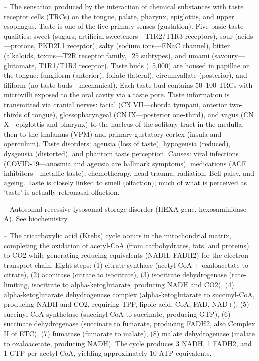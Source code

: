 -- The sensation produced by the interaction of chemical substances with taste receptor cells (TRCs) on the tongue, palate, pharynx, epiglottis, and upper esophagus. Taste is one of the five primary senses (gustation). Five basic taste qualities: sweet (sugars, artificial sweeteners—T1R2/T1R3 receptors), sour (acids—protons, PKD2L1 receptor), salty (sodium ions—ENaC channel), bitter (alkaloids, toxins—T2R receptor family, ~25 subtypes), and umami (savoury—glutamate, T1R1/T1R3 receptor). Taste buds (~5,000) are housed in papillae on the tongue: fungiform (anterior), foliate (lateral), circumvallate (posterior), and filiform (no taste buds—mechanical). Each taste bud contains 50--100 TRCs with microvilli exposed to the oral cavity via a taste pore. Taste information is transmitted via cranial nerves: facial (CN VII—chorda tympani, anterior two-thirds of tongue), glossopharyngeal (CN IX—posterior one-third), and vagus (CN X—epiglottis and pharynx) to the nucleus of the solitary tract in the medulla, then to the thalamus (VPM) and primary gustatory cortex (insula and operculum). Taste disorders: ageusia (loss of taste), hypogeusia (reduced), dysgeusia (distorted), and phantom taste perception. Causes: viral infections (COVID-19—anosmia and ageusia are hallmark symptoms), medications (ACE inhibitors—metallic taste), chemotherapy, head trauma, radiation, Bell palsy, and ageing. Taste is closely linked to smell (olfaction); much of what is perceived as 'taste' is actually retronasal olfaction.

-- Autosomal recessive lysosomal storage disorder (HEXA gene, hexosaminidase A). See biochemistry.

-- The tricarboxylic acid (Krebs) cycle occurs in the mitochondrial matrix, completing the oxidation of acetyl-CoA (from carbohydrates, fats, and proteins) to CO2 while generating reducing equivalents (NADH, FADH2) for the electron transport chain. Eight steps: (1) citrate synthase (acetyl-CoA + oxaloacetate to citrate), (2) aconitase (citrate to isocitrate), (3) isocitrate dehydrogenase (rate-limiting, isocitrate to alpha-ketoglutarate, producing NADH and CO2), (4) alpha-ketoglutarate dehydrogenase complex (alpha-ketoglutarate to succinyl-CoA, producing NADH and CO2, requiring TPP, lipoic acid, CoA, FAD, NAD+), (5) succinyl-CoA synthetase (succinyl-CoA to succinate, producing GTP), (6) succinate dehydrogenase (succinate to fumarate, producing FADH2, also Complex II of ETC), (7) fumarase (fumarate to malate), (8) malate dehydrogenase (malate to oxaloacetate, producing NADH). The cycle produces 3 NADH, 1 FADH2, and 1 GTP per acetyl-CoA, yielding approximately 10 ATP equivalents.

